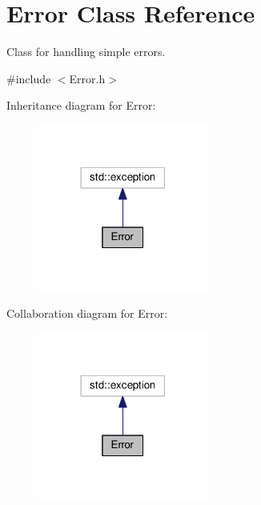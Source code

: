 \hypertarget{classError}{}\section{Error Class Reference}
\label{classError}


Class for handling simple errors.  




{\ttfamily \#include $<$Error.\+h$>$}



Inheritance diagram for Error\+:\nopagebreak
\begin{figure}[H]
\begin{center}
\leavevmode
\includegraphics[width=158pt]{classError__inherit__graph}
\end{center}
\end{figure}


Collaboration diagram for Error\+:\nopagebreak
\begin{figure}[H]
\begin{center}
\leavevmode
\includegraphics[width=158pt]{classError__coll__graph}
\end{center}
\end{figure}
